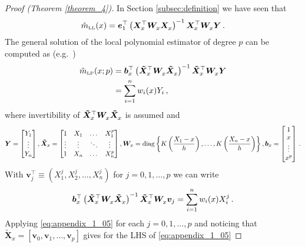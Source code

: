 \begin{proof}[Proof (Theorem \ref{theorem_4})]
	In Section \ref{subsec:definition} we have seen that
	\begin{equation}
		\hat{m}_{\textup{\tiny LL}}(x) = \bm{e}_1^\top \left( \bm{X}_x^\top \bm{W}_x^{\vphantom{\top}} \bm{X}_x^{\vphantom{\top}} \right)^{-1} \bm{X}_x^\top \bm{W}_x^{\vphantom{\top}} \bm{Y} \,.
	\end{equation}
	The general solution of the local polynomial estimator of degree $p$ can be computed as (e.g.\ \cite{Hastie_1993})
	\begin{align}
		\hat{m}_{\text{\tiny LP}}(x; p) &= \bm{b}_x^\top \left( \bm{\tilde{X}}_x^\top \bm{W}_x^{\vphantom{\top}} \bm{\tilde{X}}_x^{\vphantom{\top}} \right)^{-1} \bm{\tilde{X}}_x^\top \bm{W}_x^{\vphantom{\top}} \bm{Y} \\
							&= \sum_{i = 1}^{n} w_i(x) Y_i \,,
	\end{align}
	where invertibility of $\bm{\tilde{X}}_x^\top \bm{W}_x^{\vphantom{\top}} \bm{\tilde{X}}_x^{\vphantom{\top}}$ is assumed and
	\begin{equation}
		\bm{Y} = \begin{bmatrix} Y_1 \\ \vdots \\ Y_n \end{bmatrix},
		\bm{\tilde{X}}_x = \begin{bmatrix} 1 & X_1 & \dots & X_1^p \\ \vdots & \vdots & \ddots & \vdots \\ 1 & X_n & \dots & X_n^p \end{bmatrix},
		\bm{W}_x = \operatorname{diag} \left\{ K \left( \frac{X_1 - x}{h} \right), \dots, K \left( \frac{X_n - x}{h} \right) \right\},
		\bm{b}_x = \begin{bmatrix} 1 \\ x \\ \vdots \\ x^p \end{bmatrix} \,.
	\end{equation}
	With $\bm{v}_j^\top \equiv (X_1^j, X_2^j, \dots, X_n^j)$ for $j = 0, 1, \dots, p$ we can write
	\begin{equation} \label{eq:appendix_1_05}
		\bm{b}_x^\top \left( \bm{\tilde{X}}_x^\top \bm{W}_x^{\vphantom{\top}} \bm{\tilde{X}}_x^{\vphantom{\top}} \right)^{-1} \bm{\tilde{X}}_x^\top \bm{W}_x^{\vphantom{\top}} \bm{v}_j = \sum_{i = 1}^{n} w_i(x) X_i^j \,.
	\end{equation}
	Applying \eqref{eq:appendix_1_05} for each $j = 0, 1, \dots, p$ and noticing that $\bm{\tilde{X}}_x = [\bm{v}_0, \bm{v}_1, \dots, \bm{v}_p]$ gives for the LHS of \eqref{eq:appendix_1_05}

\end{proof}
